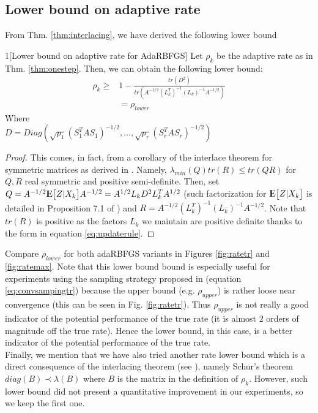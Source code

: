 \documentclass[12pt,conference,compsocconf]{IEEEtran}
\newcommand{\E}{{\rm I\kern-.3em E}}
\begin{document}
\subsection{Lower bound on adaptive rate}\label{sect:adaptive rate}
From Thm. \ref{thm:interlacing}, we have derived the following lower bound
\begin{customthm}{1}[Lower bound on adaptive rate for AdaRBFGS] \label{thm:lowerbada}
Let $\rho_k$ be the adaptive rate as in Thm. \ref{thm:onestep}. Then, we can obtain the following lower bound:
\begin{align}\label{eq:lowerbada}
\rho_k \geq &1-\frac{tr(D^2)}{tr(A^{-1/2}(L_k^T)^{-1} (L_k)^{-1}A^{-1/2})}\\ \nonumber
&=\rho_{lower} \nonumber
\end{align}
Where\\
$D=Diag(\sqrt{p_1}(S_1^TAS_1)^{-1/2},\ldots,\sqrt{p_r}(S_r^TAS_r)^{-1/2})$
\vspace{-1em}
\begin{proof}
This comes, in fact, from a corollary of the interlace theorem for symmetric matrices as derived in \cite{J Tao,Fang}. Namely, $\lambda_{min}(Q)tr(R)\leq tr(QR)$ for $Q,R$ real symmetric and positive semi-definite. Then, set $Q=A^{-1/2}\E\big[Z|X_k\big]A^{-1/2}=A^{1/2}L_kD^{2}L_k^TA^{1/2}$ (such factorization for $\E\big[Z|X_k\big]$ is detailed in Proposition 7.1 of \cite{Gower1}) and $R=A^{-1/2}(L_k^T)^{-1} (L_k)^{-1}A^{-1/2}$. Note that $tr(R)$ is positive as the factors $L_k$ we maintain are positive definite thanks to the form in equation \eqref{eq:updaterule}.
\end{proof}
\end{customthm}
Compare $\rho_{lower}$ for both adaRBFGS variants in Figures \ref{fig:ratetr} and \ref{fig:ratemax}. Note that this lower bound bound is especially useful for experiments using the sampling strategy proposed in \cite{Gower1} (equation \eqref{eq:convsampingtr}) because the upper bound (e.g. $\rho_{upper}$) is rather loose near convergence (this can be seen in Fig. \ref{fig:ratetr}). Thus $\rho_{upper}$ is not really a good indicator of the potential performance of the true rate (it is almost $2$ orders of magnitude off the true rate). Hence the lower bound, in this case, is a better indicator of the potential performance of the true rate.\\
Finally, we mention that we have also tried another rate lower bound which is a direct consequence of the interlacing theorem (see \cite{J Tao}), namely Schur's theorem $diag(B) \prec \lambda(B)$ where $B$ is the matrix in the definition of $\rho_k$. However, such lower bound did not present a quantitative improvement in our experiments, so we keep the first one.
\end{document}
